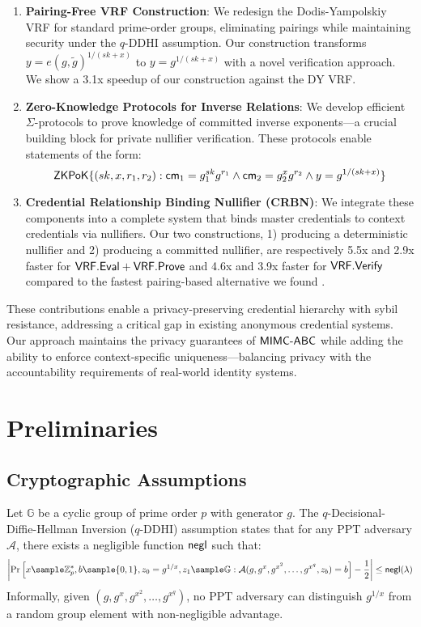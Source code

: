 \begin{enumerate}
    \item \textbf{Pairing-Free VRF Construction}: We redesign the Dodis-Yampolskiy VRF for standard prime-order groups, eliminating pairings while maintaining security under the $q$-DDHI assumption. Our construction transforms $y = e(g, \tilde{g})^{1/(sk+x)}$ to $y = g^{1/(sk+x)}$ with a novel verification approach. We show a 3.1x speedup of our construction against the DY VRF. 
    
    \item \textbf{Zero-Knowledge Protocols for Inverse Relations}: We develop efficient $\Sigma$-protocols to prove knowledge of committed inverse exponents—a crucial building block for private nullifier verification. These protocols enable statements of the form:
    \[
    {\mathsf{ZKPoK}}\{(sk, x, r_1, r_2) : \mathsf{cm}_1 = g_1^{sk}g^{r_1} \land \mathsf{cm}_2 = g_2^{x}g^{r_2} \land y = g^{1/(sk+x)}\}
    \]
    
    \item \textbf{Credential Relationship Binding Nullifier (CRBN)}: We integrate these components into a complete system that binds master credentials to context credentials via nullifiers. Our two constructions, 1) producing a deterministic nullifier and 2) producing a committed nullifier, are respectively 5.5x and 2.9x faster for  $\mathsf{VRF.Eval}+\mathsf{VRF.Prove}$ and 4.6x and 3.9x faster for $\mathsf{VRF.Verify}$ compared to the fastest pairing-based alternative we found \cite{tomescu2022utt}.
\end{enumerate}

These contributions enable a privacy-preserving credential hierarchy with sybil resistance, addressing a critical gap in existing anonymous credential systems. Our approach maintains the privacy guarantees of $\mathsf{MIMC\text{-}ABC}$ while adding the ability to enforce context-specific uniqueness—balancing privacy with the accountability requirements of real-world identity systems.






\section{Preliminaries}

\subsection{Cryptographic Assumptions}

\begin{definition}
Let $\mathbb{G}$ be a cyclic group of prime order $p$ with generator $g$. The $q$-Decisional-Diffie-Hellman Inversion ($q$-DDHI) \cite{mitsunari_new_2002} assumption states that for any PPT adversary $\mathcal{A}$, there exists a negligible function $\mathsf{negl}$ such that:
\[
\left|\Pr\left[ x \sample \Zp^*, b \sample \{0,1\}, z_0 = g^{1/x}, z_1 \sample \G : \mathcal{A}(g, g^x, g^{x^2}, \ldots, g^{x^q}, z_b) = b \right] - \frac{1}{2}\right| \leq \negl(\lambda)
\]
Informally, given $(g, g^x, g^{x^2}, \ldots, g^{x^q})$, no PPT adversary can distinguish $g^{1/x}$ from a random group element with non-negligible advantage.
\end{definition}

